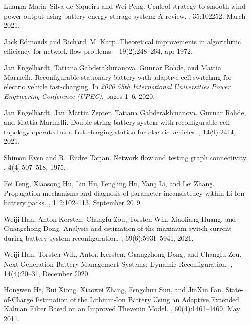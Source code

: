 \documentclass{article}
\begin{document}
\begin{thebibliography}{10}
Luanna Maria~Silva {de Siqueira} and Wei Peng.
\newblock Control strategy to smooth wind power output using battery energy
  storage system: {{A}} review.
, 35:102252, March 2021.

Jack Edmonds and Richard~M. Karp.
\newblock Theoretical improvements in algorithmic efficiency for network flow
  problems.
, 19(2):248–264, apr 1972.

Jan Engelhardt, Tatiana Gabderakhmanova, Gunnar Rohde, and Mattia Marinelli.
\newblock Reconfigurable stationary battery with adaptive cell switching for
  electric vehicle fast-charging.
\newblock In {\em 2020 55th International Universities Power Engineering
  Conference (UPEC)}, pages 1--6, 2020.

Jan Engelhardt, Jan~Martin Zepter, Tatiana Gabderakhmanova, Gunnar Rohde, and
  Mattia Marinelli.
\newblock Double-string battery system with reconfigurable cell topology
  operated as a fast charging station for electric vehicles.
, 14(9):2414, 2021.

Shimon Even and R.~Endre Tarjan.
\newblock Network flow and testing graph connectivity.
, 4(4):507--518, 1975.

Fei Feng, Xiaosong Hu, Lin Hu, Fengling Hu, Yang Li, and Lei Zhang.
\newblock Propagation mechanisms and diagnosis of parameter inconsistency
  within {{Li-Ion}} battery packs.
, 112:102--113,
  September 2019.

Weiji Han, Anton Kersten, Changfu Zou, Torsten Wik, Xiaoliang Huang, and
  Guangzhong Dong.
\newblock Analysis and estimation of the maximum switch current during battery
  system reconfiguration.
, 69(6):5931--5941,
  2021.

Weiji Han, Torsten Wik, Anton Kersten, Guangzhong Dong, and Changfu Zou.
\newblock Next-{{Generation Battery Management Systems}}: {{Dynamic
  Reconfiguration}}.
, 14(4):20--31, December
  2020.

Hongwen He, Rui Xiong, Xiaowei Zhang, Fengchun Sun, and JinXin Fan.
\newblock State-of-{{Charge Estimation}} of the {{Lithium-Ion Battery Using}}
  an {{Adaptive Extended Kalman Filter Based}} on an {{Improved Thevenin
  Model}}.
, 60(4):1461--1469,
  May 2011.


\end{thebibliography}
\end{document}
